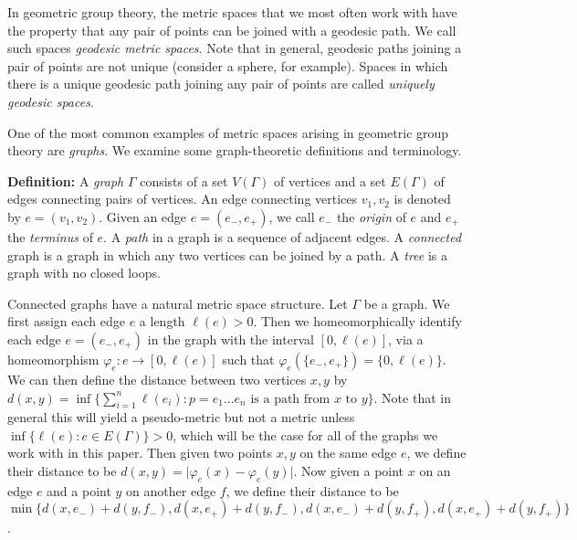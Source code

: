 \documentclass[12pt]{article}
\newcommand{\vs}{\vskip10pt}
\begin{document}
	\vs 
	
	In geometric group theory, the metric spaces that we most often work with have the property that any pair of points can be joined with a geodesic path. We call such spaces \textit{geodesic metric spaces}. Note that in general, geodesic paths joining a pair of points are not unique (consider a sphere, for example). Spaces in which there is a unique geodesic path joining any pair of points are called \textit{uniquely geodesic spaces}. 
	
	\vs 
	
	One of the most common examples of metric spaces arising in geometric group theory are \textit{graphs}. We examine some graph-theoretic definitions and terminology.
	
	\vs 
	
	\textbf{Definition: } A \textit{graph} $\Gamma$ consists of a set $V(\Gamma)$ of vertices and a set $E(\Gamma)$ of edges connecting pairs of vertices. An edge connecting vertices $v_1, v_2$ is denoted by $e = (v_1, v_2)$. Given an edge $e = (e_{-}, e_{+})$, we call $e_{-}$ the \textit{origin} of $e$ and $e_{+}$ the \textit{terminus} of $e$. A \textit{path} in a graph is a sequence of adjacent edges. A \textit{connected} graph is a graph in which any two vertices can be joined by a path. A \textit{tree} is a graph with no closed loops. 
	
	\vs
	
	Connected graphs have a natural metric space structure. Let $\Gamma$ be a graph. We first assign each edge $e$ a length $\ell(e) > 0$. Then we homeomorphically identify each edge $e = (e_{-}, e_{+})$ in the graph with the interval $[0,\ell(e)]$, via a homeomorphism $\varphi_e: e \rightarrow [0,\ell(e)]$ such that $\varphi_e (\{e_{-}, e_{+}\}) = \{0,\ell(e)\}$. We can then define the distance between two vertices $x,y$ by $d(x,y) = \inf \{\sum_{i=1}^n \ell(e_i): p = e_1...e_n \text{ is a path from } x \text{ to } y\}$. Note that in general this will yield a pseudo-metric but not a metric unless $\inf \{\ell(e) : e \in E(\Gamma)\}> 0$, which will be the case for all of the graphs we work with in this paper. Then given two points $x,y$ on the same edge $e$, we define their distance to be $d(x,y) = \vert \varphi_e(x) - \varphi_e(y) \vert$. Now given a point $x$ on an edge $e$ and a point $y$ on another edge $f$, we define their distance to be $\min \{d(x,e_{-}) + d(y, f_{-}), d(x,e_{+}) + d(y, f_{-}), d(x,e_{-}) + d(y, f_{+}), d(x,e_{+}) + d(y, f_{+})\}$. 
	
	
\end{document}
